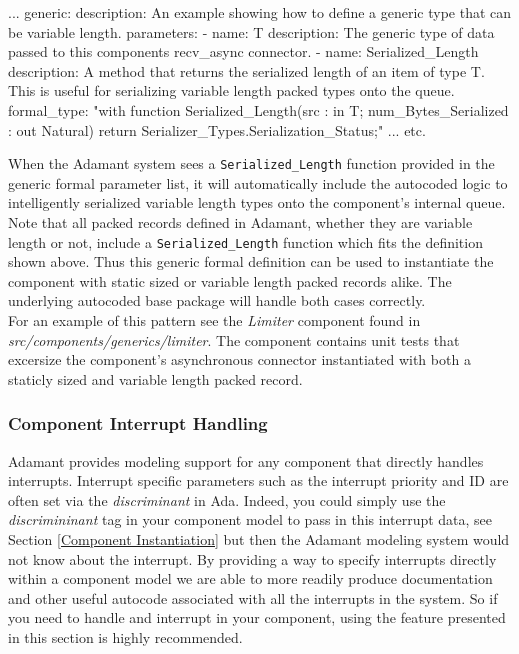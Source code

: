 \vspace{5mm} %
\begin{yamlcode}
...
generic:
  description: An example showing how to define a generic type that can be variable length.
  parameters:
    - name: T
      description: The generic type of data passed to this components recv_async connector.
    - name: Serialized_Length
      description: A method that returns the serialized length of an item of type T. This is useful for serializing variable length packed types onto the queue.
      formal_type: "with function Serialized_Length(src : in T; num_Bytes_Serialized : out Natural) return Serializer_Types.Serialization_Status;"
...
etc.
\end{yamlcode}
\vspace{5mm} %

When the Adamant system sees a \texttt{Serialized\_Length} function provided in the generic formal parameter list, it will automatically include the autocoded logic to intelligently serialized variable length types onto the component's internal queue. Note that all packed records defined in Adamant, whether they are variable length or not, include a \texttt{Serialized\_Length} function which fits the definition shown above. Thus this generic formal definition can be used to instantiate the component with static sized or variable length packed records alike. The underlying autocoded base package will handle both cases correctly. \\

For an example of this pattern see the \textit{Limiter} component found in \textit{src/components/generics/limiter}. The component contains unit tests that excersize the component's asynchronous connector instantiated with both a staticly sized and variable length packed record.

\subsubsection{Component Interrupt Handling} \label{Component Interrupt Handling}

Adamant provides modeling support for any component that directly handles interrupts. Interrupt specific parameters such as the interrupt priority and ID are often set via the \textit{discriminant} in Ada. Indeed, you could simply use the \textit{discrimininant} tag in your component model to pass in this interrupt data, see Section \ref{Component Instantiation} but then the Adamant modeling system would not know about the interrupt. By providing a way to specify interrupts directly within a component model we are able to more readily produce documentation and other useful autocode associated with all the interrupts in the system. So if you need to handle and interrupt in your component, using the feature presented in this section is highly recommended. \\


